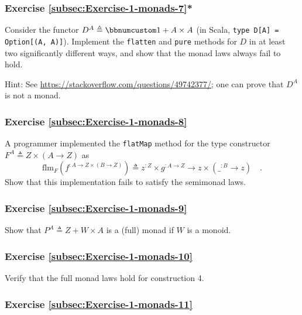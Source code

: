 \subsubsection{Exercise \label{subsec:Exercise-1-monads-7}\ref{subsec:Exercise-1-monads-7}{*}}

Consider the functor $D^{A}\triangleq\bbnum 1+A\times A$ (in Scala,
\lstinline!type D[A] = Option[(A, A)]!). Implement the \lstinline!flatten!
and \lstinline!pure! methods for $D$ in at least two significantly
different ways, and show that the monad laws always fail to hold.

Hint: See \href{https://stackoverflow.com/questions/49742377/}{https://stackoverflow.com/questions/49742377/};
one can prove that $D^{A}$ is not a monad.

\subsubsection{Exercise \label{subsec:Exercise-1-monads-8}\ref{subsec:Exercise-1-monads-8}}

A programmer implemented the \lstinline!flatMap! method for the type
constructor $F^{A}\triangleq Z\times\left(A\rightarrow Z\right)$
as 
\[
\text{flm}_{F}(f^{:A\rightarrow Z\times\left(B\rightarrow Z\right)})\triangleq z^{:Z}\times g^{:A\rightarrow Z}\rightarrow z\times\left(\_^{:B}\rightarrow z\right)\quad.
\]
Show that this implementation fails to satisfy the semimonad laws.

\subsubsection{Exercise \label{subsec:Exercise-1-monads-9}\ref{subsec:Exercise-1-monads-9}}

Show that $P^{A}\triangleq Z+W\times A$ is a (full) monad if $W$
is a monoid.

\subsubsection{Exercise \label{subsec:Exercise-1-monads-10}\ref{subsec:Exercise-1-monads-10}}

Verify that the full monad laws hold for construction 4.

\subsubsection{Exercise \label{subsec:Exercise-1-monads-11}\ref{subsec:Exercise-1-monads-11}}

